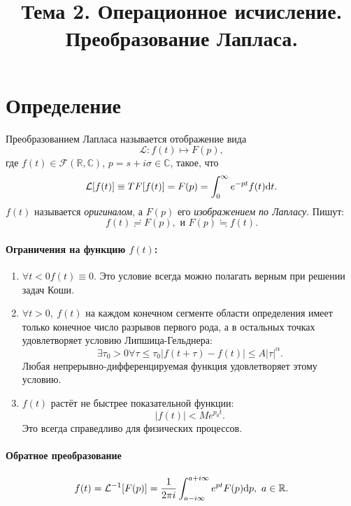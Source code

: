 \documentclass[12pt]{report}
\title{Тема 2. Операционное исчисление. Преобразование Лапласа.}
\renewcommand{\L}{\mathcal L}
\newcommand{\F}{\mathcal F}
\newcommand{\R}{\mathbb R}
\renewcommand{\C}{\mathbb C}
\renewcommand{\i}{i}
\begin{document}
	\maketitle
	\tableofcontents
	
	
\section{Определение}
Преобразованием Лапласа называется отображение вида~\cite{Dubkov:Lecture}
\[
\L : f(t) \mapsto F(p),
\]
где $f(t) \in \F(\R, \C)$, $p = s + \i\sigma \in \C$, такое, что
\[
\L[f(t)]\equiv TF[f(t)] = F(p) = \int_{0}^{\infty} e^{-pt}f(t)\rd t.
\]
$f(t)$ называется \emph{оригиналом}, а $F(p)$ его \emph{изображением по Лапласу}. Пишут:
\[
f(t) \risingdotseq F(p), \text{ и } F(p) \fallingdotseq f(t). 
\]
\paragraph{Ограничения на функцию $f(t)$:}
\begin{enumerate}
	\item $\forall t < 0f(t) \equiv 0$. Это условие всегда можно полагать верным при решении задач Коши.
	\item $\forall t > 0,~ f(t)$ на каждом конечном сегменте области определения имеет только конечное число разрывов первого рода, а в остальных точках удовлетворяет условию Липшица-Гельднера: 
	\[\exists\tau_0>0\forall \tau \leq \tau_0 |f(t+\tau) - f(t)| \leq A|\tau|^\alpha.\]
	Любая непрерывно-дифференцируемая функция удовлетворяет этому условию.
	\item $f(t)$ растёт не быстрее показательной функции: \[ |f(t)| < Me^{p_0t}.\] Это всегда справедливо для физических процессов. \label{itm:original-conditions:growth}
\end{enumerate}

\paragraph{Обратное преобразование}
\[
f(t) = \L^{-1}[F(p)] = \frac{1}{2\pi\i}\int_{a - \i\infty}^{a+\i\infty}e^{pt}F(p)\rd p, ~ a\in\R.
\]
\end{document}
